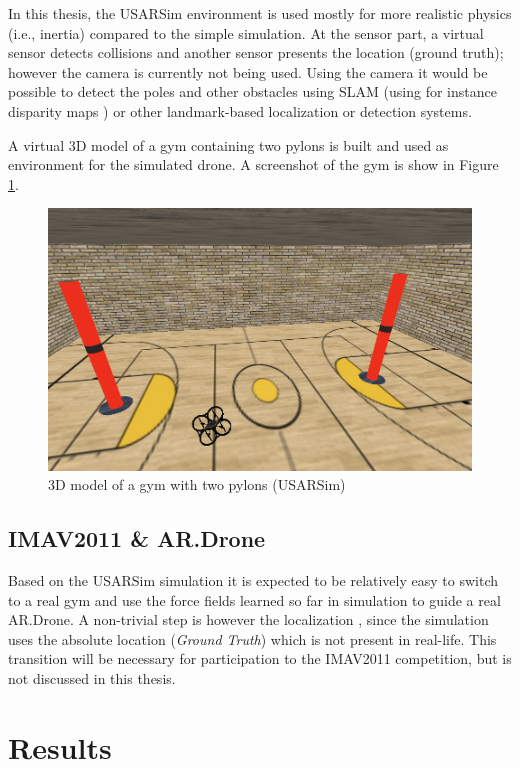 \documentclass[11pt]{article}
\begin{document}
In this thesis, the USARSim environment is used mostly for more realistic physics (i.e., inertia) compared to the simple simulation. At the sensor part, a virtual sensor detects collisions and another sensor presents the location (ground truth); however the camera is currently not being used. Using the camera it would be possible to detect the poles and other obstacles using SLAM (using for instance disparity maps \cite{robrecht}) or other landmark-based localization or detection systems.

A virtual 3D model of a gym containing two pylons is built and used as environment for the simulated drone. A screenshot of the gym is show in Figure \ref{fig:gym}.

  \begin{figure}
    \includegraphics[width=1.0\textwidth]{img/gym}
    \caption{3D model of a gym with two pylons (USARSim)}
    \label{fig:gym}
  \end{figure}


\subsection{IMAV2011 \& AR.Drone}
Based on the USARSim simulation it is expected to be relatively easy to switch to a real gym and use the force fields learned so far in simulation to guide a real AR.Drone. A non-trivial step is however the localization \cite{nick}, since the simulation uses the absolute location (\emph{Ground Truth}) which is not present in real-life. This transition will be necessary for participation to the IMAV2011 competition, but is not discussed in this thesis.



\pagebreak
\section{Results}
\label{sec:results}
\end{document}
